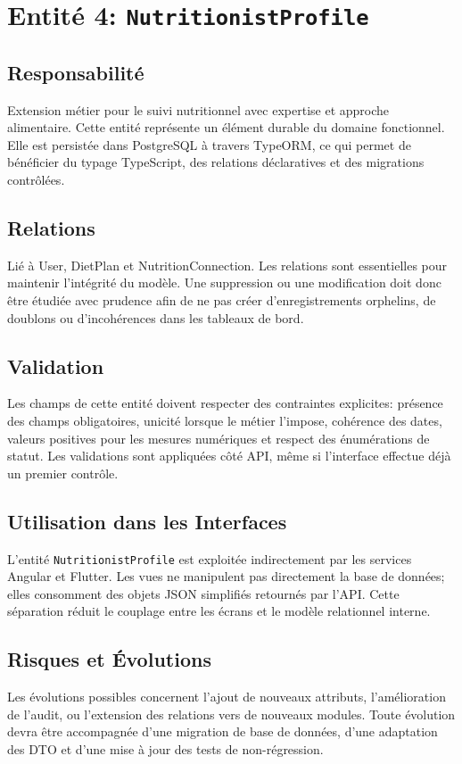 \section{Entité 4: \texttt{NutritionistProfile}}
\subsection{Responsabilité}
Extension métier pour le suivi nutritionnel avec expertise et approche alimentaire. Cette entité représente un élément durable du domaine fonctionnel. Elle est persistée dans PostgreSQL à travers TypeORM, ce qui permet de bénéficier du typage TypeScript, des relations déclaratives et des migrations contrôlées.

\subsection{Relations}
Lié à User, DietPlan et NutritionConnection. Les relations sont essentielles pour maintenir l'intégrité du modèle. Une suppression ou une modification doit donc être étudiée avec prudence afin de ne pas créer d'enregistrements orphelins, de doublons ou d'incohérences dans les tableaux de bord.

\subsection{Validation}
Les champs de cette entité doivent respecter des contraintes explicites: présence des champs obligatoires, unicité lorsque le métier l'impose, cohérence des dates, valeurs positives pour les mesures numériques et respect des énumérations de statut. Les validations sont appliquées côté API, même si l'interface effectue déjà un premier contrôle.

\subsection{Utilisation dans les Interfaces}
L'entité \texttt{NutritionistProfile} est exploitée indirectement par les services Angular et Flutter. Les vues ne manipulent pas directement la base de données; elles consomment des objets JSON simplifiés retournés par l'API. Cette séparation réduit le couplage entre les écrans et le modèle relationnel interne.

\subsection{Risques et Évolutions}
Les évolutions possibles concernent l'ajout de nouveaux attributs, l'amélioration de l'audit, ou l'extension des relations vers de nouveaux modules. Toute évolution devra être accompagnée d'une migration de base de données, d'une adaptation des DTO et d'une mise à jour des tests de non-régression.

